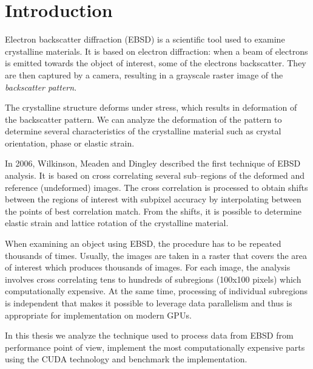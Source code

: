 \chapter*{Introduction}
Electron backscatter diffraction (EBSD) is a scientific tool used to examine crystalline materials. It is based on electron diffraction: when a beam of electrons is emitted towards the object of interest, some of the electrons backscatter. They are then captured by a camera, resulting in a grayscale raster image of the \emph{backscatter pattern}.

The crystalline structure deforms under stress, which results in deformation of the backscatter pattern. We can analyze the deformation of the pattern to determine several characteristics of the crystalline material such as crystal orientation, phase or elastic strain.

In 2006, Wilkinson, Meaden and Dingley described the first technique of EBSD analysis. It is based on cross correlating several sub--regions  of the deformed and reference (undeformed) images. The cross correlation is processed to obtain shifts between the regions of interest with subpixel accuracy by interpolating between the points of best correlation match. From the shifts, it is possible to determine elastic strain and lattice rotation of the crystalline material.

When examining an object using EBSD, the procedure has to be repeated thousands of times. Usually, the images are taken in a raster that covers the area of interest which produces thousands of images. For each image, the analysis involves cross correlating tens to hundreds of subregions (100x100 pixels) which computationally expensive. At the same time, processing of individual subregions is independent that makes it possible to leverage data parallelism and thus is appropriate for implementation on modern GPUs. 

In this thesis we analyze the technique used to process data from EBSD from performance point of view, implement the most computationally expensive parts using the CUDA technology and benchmark the implementation. 
